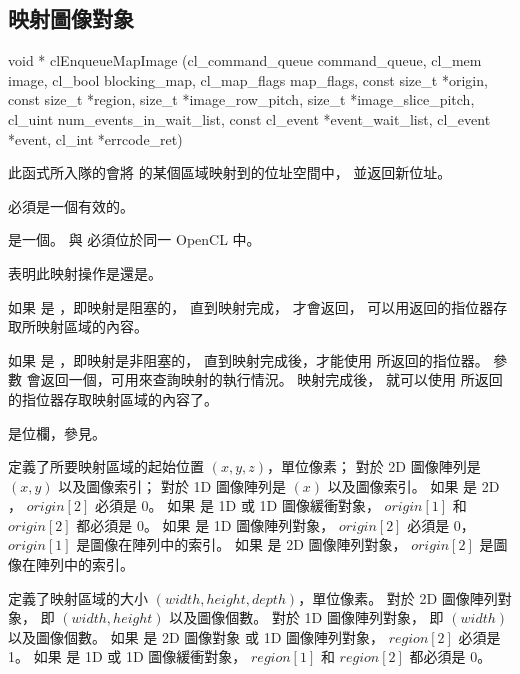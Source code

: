 \subsection{映射圖像對象}


\startCLFUNC
void * clEnqueueMapImage (cl_command_queue command_queue,
			cl_mem image,
			cl_bool blocking_map,
			cl_map_flags map_flags,
			const size_t *origin,
			const size_t *region,
			size_t *image_row_pitch,
			size_t *image_slice_pitch,
			cl_uint num_events_in_wait_list,
			const cl_event *event_wait_list,
			cl_event *event,
			cl_int *errcode_ret)
\stopCLFUNC

此函式所入隊的會將  的某個區域映射到的位址空間中，
並返回新位址。

 必須是一個有效的。

 是一個。
 與  必須位於同一 OpenCL 中。

 表明此映射操作是{}還是{}。

如果  是 ，即映射是阻塞的，
直到映射完成，  才會返回，
可以用返回的指位器存取所映射區域的內容。

如果  是 ，即映射是非阻塞的，
直到映射完成後，才能使用  所返回的指位器。
參數  會返回一個，可用來查詢映射的執行情況。
映射完成後，
就可以使用  所返回的指位器存取映射區域的內容了。

 是位欄，參見。

 定義了所要映射區域的起始位置 $(x, y, z)$，單位像素；
對於 2D 圖像陣列是 $(x, y)$ 以及圖像索引；
對於 1D 圖像陣列是 $(x)$ 以及圖像索引。
如果  是 2D ， $origin[2]$ 必須是 0。
如果  是 1D 或 1D 圖像緩衝對象，
$origin[1]$ 和 $origin[2]$ 都必須是 0。
如果  是 1D 圖像陣列對象， $origin[2]$ 必須是 0，
$origin[1]$ 是圖像在陣列中的索引。
如果  是 2D 圖像陣列對象， $origin[2]$ 是圖像在陣列中的索引。

 定義了映射區域的大小 $(width, height, depth)$，單位像素。
對於 2D 圖像陣列對象， 即 $(width, height)$ 以及圖像個數。
對於 1D 圖像陣列對象， 即 $(width)$ 以及圖像個數。
如果  是 2D 圖像對象 或 1D 圖像陣列對象， $region[2]$ 必須是 1。
如果  是 1D 或 1D 圖像緩衝對象，
$region[1]$ 和 $region[2]$ 都必須是 0。

